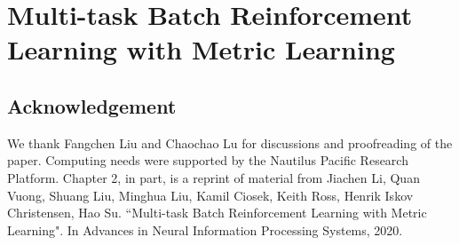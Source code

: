 \chapter{Multi-task Batch Reinforcement Learning with Metric Learning}













\section{Acknowledgement}

We thank Fangchen Liu and Chaochao Lu for discussions and proofreading of the paper. Computing needs were supported by the Nautilus Pacific Research Platform. Chapter 2, in part, is a reprint of material from  Jiachen Li, Quan Vuong, Shuang Liu, Minghua Liu, Kamil Ciosek, Keith Ross, Henrik Iskov Christensen, Hao Su. ``Multi-task Batch Reinforcement Learning with Metric Learning". In Advances in Neural Information Processing Systems, 2020.
